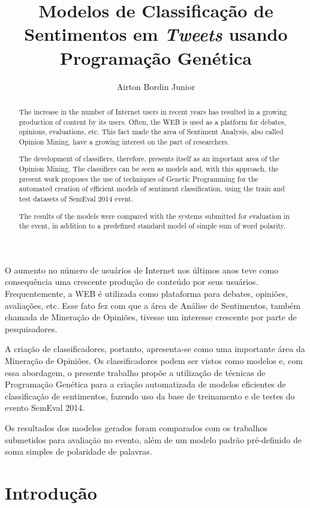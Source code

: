 \documentclass[12pt]{article}
\title{Modelos de Classificação de Sentimentos em \emph{Tweets} usando Programação Genética}
\author{Airton Bordin Junior\inst{1}}
\begin{document}
 

\maketitle

\begin{abstract}
The increase in the number of Internet users in recent years has resulted in a growing production of content by its users. Often, the WEB is used as a platform for debates, opinions, evaluations, etc. This fact made the area of Sentiment Analysis, also called Opinion Mining, have a growing interest on the part of researchers.

The development of classifiers, therefore, presents itself as an important area of the Opinion Mining. The classifiers can be seen as models and, with this approach, the present work proposes the use of techniques of Genetic Programming for the automated creation of efficient models of sentiment classification, using the train and test datasets of SemEval 2014 event.

The results of the models were compared with the systems submitted for evaluation in the event, in addition to a predefined standard model of simple sum of word polarity.
\end{abstract}

\begin{resumo} 
O aumento no número de usuários de Internet nos últimos anos teve como consequência uma crescente produção de conteúdo por seus usuários. Frequentemente, a WEB é utilizada como plataforma para debates, opiniões, avaliações, etc. Esse fato fez com que a área de Análise de Sentimentos, também chamada de Mineração de Opiniões, tivesse um interesse crescente por parte de pesquisadores. 

A criação de classificadores, portanto, apresenta-se como uma importante área da Mineração de Opiniões. Os classificadores podem ser vistos como modelos e, com essa abordagem, o presente trabalho propõe a utilização de técnicas de Programação Genética para a criação automatizada de modelos eficientes de classificação de sentimentos, fazendo uso da base de treinamento e de testes do evento SemEval 2014.

Os resultados dos modelos gerados foram comparados com os trabalhos submetidos para avaliação no evento, além de um modelo padrão pré-definido de soma simples de polaridade de palavras.
\end{resumo}

\section{Introdução}
\end{document}
